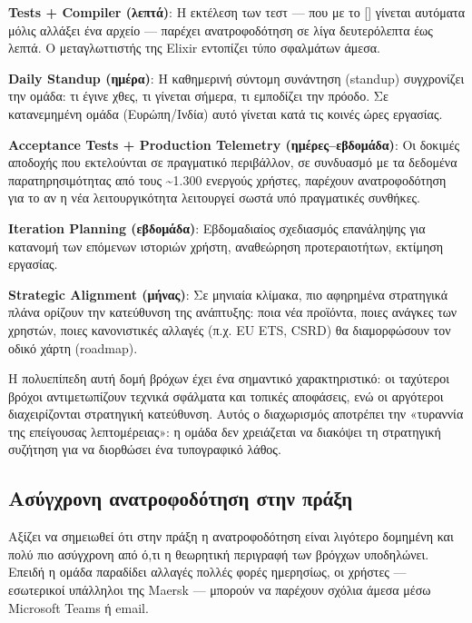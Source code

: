 \documentclass[11pt,a4paper,greek,twoside]{template-xe}
\let\origtexttt\texttt
\renewcommand{\texttt}[1]{%
  \begingroup
  \StrSubstitute{#1}{.}{.\allowbreak}[\tttmp]%
  \origtexttt{\tttmp}%
  \endgroup
}
\begin{document}
\textbf{Tests + Compiler (λεπτά)}: Η εκτέλεση των τεστ --- που με το
\texttt{mix\ test.watch} γίνεται αυτόματα μόλις αλλάξει ένα αρχείο ---
παρέχει ανατροφοδότηση σε λίγα δευτερόλεπτα έως λεπτά. Ο μεταγλωττιστής
της Elixir εντοπίζει τύπο σφαλμάτων άμεσα.

\textbf{Daily Standup (ημέρα)}: Η καθημερινή σύντομη συνάντηση (standup)
συγχρονίζει την ομάδα: τι έγινε χθες, τι γίνεται σήμερα, τι εμποδίζει
την πρόοδο. Σε κατανεμημένη ομάδα (Ευρώπη/Ινδία) αυτό γίνεται κατά τις
κοινές ώρες εργασίας.

\textbf{Acceptance Tests + Production Telemetry (ημέρες--εβδομάδα)}: Οι
δοκιμές αποδοχής που εκτελούνται σε πραγματικό περιβάλλον, σε συνδυασμό
με τα δεδομένα παρατηρησιμότητας από τους \textasciitilde1.300 ενεργούς
χρήστες, παρέχουν ανατροφοδότηση για το αν η νέα λειτουργικότητα
λειτουργεί σωστά υπό πραγματικές συνθήκες.

\textbf{Iteration Planning (εβδομάδα)}: Εβδομαδιαίος σχεδιασμός
επανάληψης για κατανομή των επόμενων ιστοριών χρήστη, αναθεώρηση
προτεραιοτήτων, εκτίμηση εργασίας.

\textbf{Strategic Alignment (μήνας)}: Σε μηνιαία κλίμακα, πιο αφηρημένα
στρατηγικά πλάνα ορίζουν την κατεύθυνση της ανάπτυξης: ποια νέα
προϊόντα, ποιες ανάγκες των χρηστών, ποιες κανονιστικές αλλαγές (π.χ. EU
ETS, CSRD) θα διαμορφώσουν τον οδικό χάρτη (roadmap).

Η πολυεπίπεδη αυτή δομή βρόχων έχει ένα σημαντικό χαρακτηριστικό: οι
ταχύτεροι βρόχοι αντιμετωπίζουν τεχνικά σφάλματα και τοπικές αποφάσεις,
ενώ οι αργότεροι διαχειρίζονται στρατηγική κατεύθυνση. Αυτός ο
διαχωρισμός αποτρέπει την «τυραννία της επείγουσας λεπτομέρειας»: η
ομάδα δεν χρειάζεται να διακόψει τη στρατηγική συζήτηση για να διορθώσει
ένα τυπογραφικό λάθος.

\subsection{Ασύγχρονη ανατροφοδότηση στην
πράξη}\label{ux3b1ux3c3ux3cdux3b3ux3c7ux3c1ux3bfux3bdux3b7-ux3b1ux3bdux3b1ux3c4ux3c1ux3bfux3c6ux3bfux3b4ux3ccux3c4ux3b7ux3c3ux3b7-ux3c3ux3c4ux3b7ux3bd-ux3c0ux3c1ux3acux3beux3b7}

Αξίζει να σημειωθεί ότι στην πράξη η ανατροφοδότηση είναι λιγότερο
δομημένη και πολύ πιο ασύγχρονη από ό,τι η θεωρητική περιγραφή των
βρόγχων υποδηλώνει. Επειδή η ομάδα παραδίδει αλλαγές πολλές φορές
ημερησίως, οι χρήστες --- εσωτερικοί υπάλληλοι της Maersk --- μπορούν να
παρέχουν σχόλια άμεσα μέσω Microsoft Teams ή email.
\end{document}

